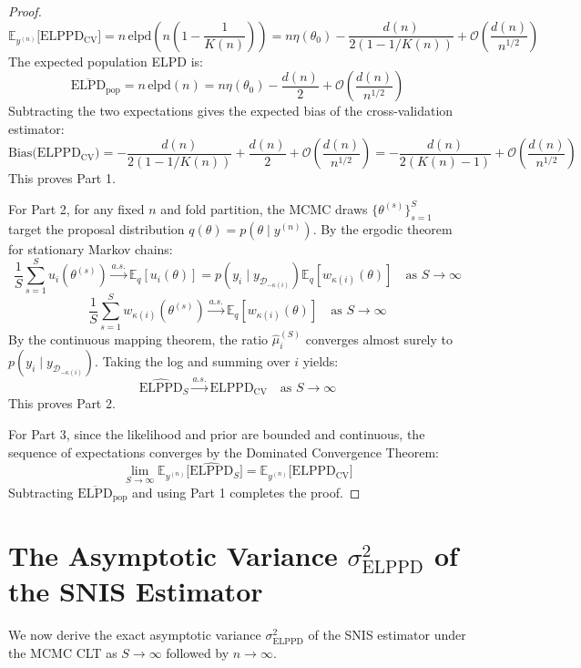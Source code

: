 \documentclass[12pt]{article}
\begin{document}
\begin{proof}
\[
\mathbb{E}_{y^{(n)}}\big[\text{ELPPD}_{\text{CV}}\big] = n \, \text{elpd}\left(n\left(1 - \frac{1}{K(n)}\right)\right) = n \eta(\theta_0) - \frac{d(n)}{2(1 - 1/K(n))} + \mathcal{O}\left(\frac{d(n)}{n^{1/2}}\right)
\]
The expected population ELPD is:
\[
\overline{\text{ELPD}}_{\text{pop}} = n \, \text{elpd}(n) = n \eta(\theta_0) - \frac{d(n)}{2} + \mathcal{O}\left(\frac{d(n)}{n^{1/2}}\right)
\]
Subtracting the two expectations gives the expected bias of the cross-validation estimator:
\[
\text{Bias}\big(\text{ELPPD}_{\text{CV}}\big) = -\frac{d(n)}{2(1 - 1/K(n))} + \frac{d(n)}{2} + \mathcal{O}\left(\frac{d(n)}{n^{1/2}}\right) = -\frac{d(n)}{2(K(n) - 1)} + \mathcal{O}\left(\frac{d(n)}{n^{1/2}}\right)
\]
This proves Part 1.

For Part 2, for any fixed $n$ and fold partition, the MCMC draws $\{\theta^{(s)}\}_{s=1}^S$ target the proposal distribution $q(\theta) = p(\theta \mid y^{(n)})$. By the ergodic theorem for stationary Markov chains:
\[
\frac{1}{S}\sum_{s=1}^S u_i(\theta^{(s)}) \xrightarrow{a.s.} \mathbb{E}_q[u_i(\theta)] = p(y_i \mid y_{\mathcal{D}_{-\kappa(i)}}) \mathbb{E}_q[w_{\kappa(i)}(\theta)] \quad \text{as } S \to \infty
\]
\[
\frac{1}{S}\sum_{s=1}^S w_{\kappa(i)}(\theta^{(s)}) \xrightarrow{a.s.} \mathbb{E}_q[w_{\kappa(i)}(\theta)] \quad \text{as } S \to \infty
\]
By the continuous mapping theorem, the ratio $\widehat{\mu}_i^{(S)}$ converges almost surely to $p(y_i \mid y_{\mathcal{D}_{-\kappa(i)}})$. Taking the log and summing over $i$ yields:
\[
\widehat{\text{ELPPD}}_S \xrightarrow{a.s.} \text{ELPPD}_{\text{CV}} \quad \text{as } S \to \infty
\]
This proves Part 2.

For Part 3, since the likelihood and prior are bounded and continuous, the sequence of expectations converges by the Dominated Convergence Theorem:
\[
\lim_{S \to \infty} \mathbb{E}_{y^{(n)}}\big[\widehat{\text{ELPPD}}_S\big] = \mathbb{E}_{y^{(n)}}\big[\text{ELPPD}_{\text{CV}}\big]
\]
Subtracting $\overline{\text{ELPD}}_{\text{pop}}$ and using Part 1 completes the proof.
\end{proof}

\section{The Asymptotic Variance $\sigma^2_{\mathrm{ELPPD}}$ of the SNIS Estimator}
We now derive the exact asymptotic variance $\sigma^2_{\mathrm{ELPPD}}$ of the SNIS estimator under the MCMC CLT as $S \to \infty$ followed by $n \to \infty$.
\end{document}
